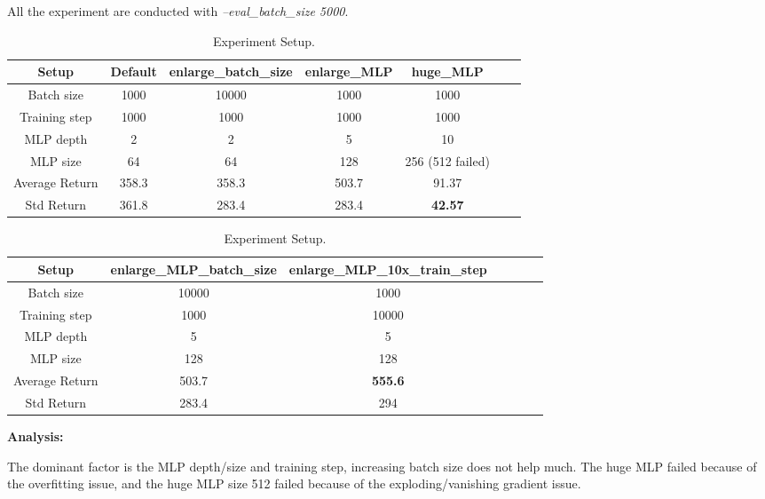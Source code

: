 \documentclass{article}
\begin{document}
All the experiment are conducted with \textit{--eval\_batch\_size 5000}.

\begin{table}[!h]
  \centering
  \begin{tabular}{c|cccccc}
    \toprule[1.0pt]
    Setup          & Default & enlarge\_batch\_size & enlarge\_MLP & huge\_MLP        \\
    \midrule
    Batch size     & 1000    & 10000                & 1000         & 1000             \\
    Training step  & 1000    & 1000                 & 1000         & 1000             \\
    MLP depth      & 2       & 2                    & 5            & 10               \\
    MLP size       & 64      & 64                   & 128          & 256 (512 failed) \\
    \midrule
    Average Return & 358.3   & 358.3                & 503.7        & 91.37            \\
    Std Return     & 361.8   & 283.4                & 283.4        & \textbf{42.57}   \\
    \bottomrule[1.0pt]
  \end{tabular}
  \begin{tabular}{c|cccccc}
    \toprule[1.0pt]
    Setup          & enlarge\_MLP\_batch\_size & enlarge\_MLP\_10x\_train\_step \\
    \midrule
    Batch size     & 10000                     & 1000                           \\
    Training step  & 1000                      & 10000                          \\
    MLP depth      & 5                         & 5                              \\
    MLP size       & 128                       & 128                            \\
    \midrule
    Average Return & 503.7                     & \textbf{555.6}                 \\
    Std Return     & 283.4                     & 294                            \\
    \bottomrule[1.0pt]
  \end{tabular}
  \caption{Experiment Setup.}
  \label{tab:p4}
\end{table}

\textbf{Analysis:}

The dominant factor is the MLP depth/size and training step, increasing batch size does not help much. The huge MLP failed because of the overfitting issue, and the huge MLP size 512 failed because of the exploding/vanishing gradient issue.
\end{document}
